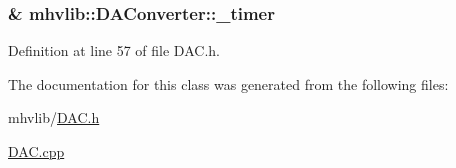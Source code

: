 \hypertarget{classmhvlib_1_1_d_a_converter_aa17d03b8c37fef817a4584bd63a45448}{
\subsubsection[{\-\_\-timer}]{\& mhvlib\-::\-D\-A\-Converter\-::\-\_\-timer\hspace{0.3cm}{\ttfamily [protected]}}}\label{classmhvlib_1_1_d_a_converter_aa17d03b8c37fef817a4584bd63a45448}


Definition at line 57 of file D\-A\-C.\-h.



The documentation for this class was generated from the following files\-:\begin{DoxyCompactItemize}
\item 
mhvlib/\hyperlink{_d_a_c_8h}{D\-A\-C.\-h}\item 
\hyperlink{_d_a_c_8cpp}{D\-A\-C.\-cpp}\end{DoxyCompactItemize}

